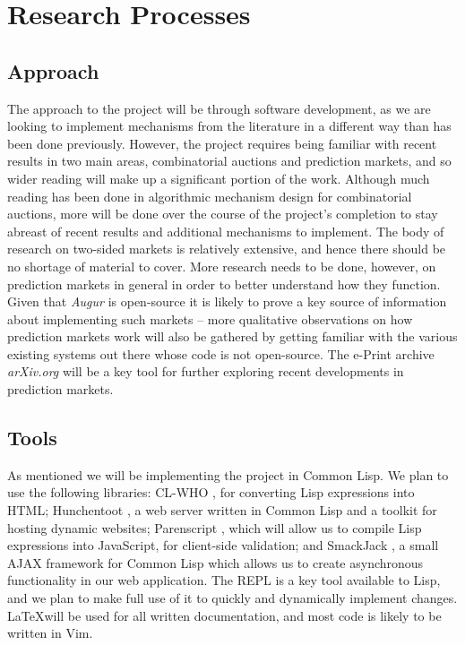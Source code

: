 \documentclass[10pt,a4paper]{article}
\theoremstyle{plain}
\theoremstyle{definition}
\begin{document}
\section{Research Processes}
	\label{sec:researchProcesses}

	\subsection{Approach}

	The approach to the project will be through software development, as we are
	looking to implement mechanisms from the literature in a different way than
	has been done previously. However, the project requires being familiar with
	recent results in two main areas, combinatorial auctions and prediction
	markets, and so wider reading will make up a significant portion of the
	work. Although much reading has been done in algorithmic mechanism design
	for combinatorial auctions, more will be done over the course of the
	project's completion to stay abreast of recent results and additional
	mechanisms to implement. The body of research on two-sided markets is
	relatively extensive, and hence there should be no shortage of material to
	cover. More research needs to be done, however, on prediction markets in
	general in order to better understand how they function. Given that
	\emph{Augur} is open-source it is likely to prove a key source of
	information about implementing such markets -- more qualitative
	observations on how prediction markets work will also be gathered by
	getting familiar with the various existing systems out there whose code is
	not open-source. The e-Print archive \emph{arXiv.org} will be a key tool
	for further exploring recent developments in prediction markets.

	\subsection{Tools} 

	As mentioned we will be implementing the project in Common Lisp. We plan to
	use the following libraries: CL-WHO \cite{CL-WHO}, for converting Lisp
	expressions into HTML; Hunchentoot \cite{Hunchentoot}, a web server written
	in Common Lisp and a toolkit for hosting dynamic websites; Parenscript
	\cite{Parenscript}, which will allow us to compile Lisp expressions into
	JavaScript, for client-side validation; and SmackJack \cite{SmackJack}, a
	small AJAX framework for Common Lisp which allows us to create asynchronous
	functionality in our web application. The REPL is a key tool available to
	Lisp, and we plan to make full use of it to quickly and dynamically
	implement changes. \LaTeX will be used for all written documentation, and
	most code is likely to be written in Vim.
\end{document}
